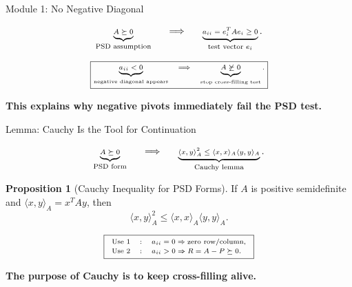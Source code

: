 \documentclass[10pt]{beamer}
\theoremstyle{definition}
\newtheorem{prop}{Proposition}[section]
\newcommand{\x}[1]{\alert{\textbf{#1}}}
\begin{document}
\begin{frame}{Module 1: No Negative Diagonal}

\[
\scriptsize
\underbrace{A\succeq0}_{\text{PSD assumption}}
\qquad\Longrightarrow\qquad
\underbrace{a_{ii}=e_i^TAe_i\ge0}_{\text{test vector }e_i}.
\]

\vfill

\[
\scriptsize
\boxed{
\underbrace{a_{ii}<0}_{\text{negative diagonal appears}}
\quad\Longrightarrow\quad
\underbrace{A\not\succeq0}_{\text{stop cross-filling test}}.
}
\]

\vfill

\begin{center}
\x{This explains why negative pivots immediately fail the PSD test.}
\end{center}

\end{frame}



\begin{frame}[shrink=8]{Lemma: Cauchy Is the Tool for Continuation}

\[
\scriptsize
\underbrace{A\succeq0}_{\text{PSD form}}
\qquad\Longrightarrow\qquad
\underbrace{\langle x,y\rangle_A^2
\le
\langle x,x\rangle_A\langle y,y\rangle_A}_{\text{Cauchy lemma}}.
\]

\vfill

\begin{prop}[Cauchy Inequality for PSD Forms]
If $A$ is positive semidefinite and $\langle x,y\rangle_A=x^TAy$, then
$$
\langle x,y\rangle_A^2
\le
\langle x,x\rangle_A\langle y,y\rangle_A.
$$
\end{prop}

\vfill

\[
\scriptsize
\boxed{
\begin{array}{ccl}
\text{Use 1} &:& a_{ii}=0\Rightarrow \text{zero row/column},\\[0.2em]
\text{Use 2} &:& a_{ii}>0\Rightarrow R=A-P\succeq0.
\end{array}}
\]

\vfill

\begin{center}
\x{The purpose of Cauchy is to keep cross-filling alive.}
\end{center}

\end{frame}
\end{document}
